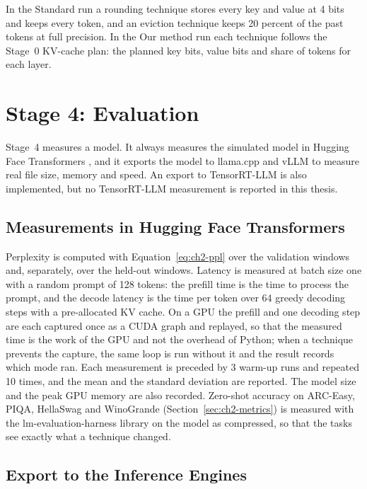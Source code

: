 In the Standard run a rounding technique stores every key and value at 4 bits and keeps every token, and an eviction technique keeps 20 percent of the past tokens at full precision. In the Our method run each technique follows the Stage~0 KV-cache plan: the planned key bits, value bits and share of tokens for each layer.

\section{Stage 4: Evaluation}
\label{sec:ch4-stage4}

Stage~4 measures a model. It always measures the simulated model in Hugging Face Transformers \cite{wolf2020transformers}, and it exports the model to llama.cpp \cite{ggml2025llamacpp} and vLLM \cite{kwon2023vllm} to measure real file size, memory and speed. An export to TensorRT-LLM \cite{nvidia2025tensorrtllm} is also implemented, but no TensorRT-LLM measurement is reported in this thesis.

\subsection{Measurements in Hugging Face Transformers}
\label{sec:ch4-hf}

Perplexity is computed with Equation~\ref{eq:ch2-ppl} over the validation windows and, separately, over the held-out windows. Latency is measured at batch size one with a random prompt of 128 tokens: the prefill time is the time to process the prompt, and the decode latency is the time per token over 64 greedy decoding steps with a pre-allocated KV cache. On a GPU the prefill and one decoding step are each captured once as a CUDA graph and replayed, so that the measured time is the work of the GPU and not the overhead of Python; when a technique prevents the capture, the same loop is run without it and the result records which mode ran. Each measurement is preceded by 3 warm-up runs and repeated 10 times, and the mean and the standard deviation are reported. The model size and the peak GPU memory are also recorded. Zero-shot accuracy on ARC-Easy, PIQA, HellaSwag and WinoGrande (Section~\ref{sec:ch2-metrics}) is measured with the lm-evaluation-harness library on the model as compressed, so that the tasks see exactly what a technique changed.

\subsection{Export to the Inference Engines}
\label{sec:ch4-export}

